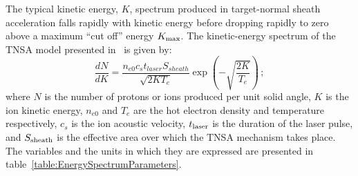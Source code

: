 The typical kinetic energy, $K$, spectrum produced in target-normal
sheath acceleration falls rapidly with kinetic energy before dropping
rapidly to zero above a maximum ``cut off'' energy $K_{\rm max}$.
The kinetic-energy spectrum of the TNSA model presented
in~\cite{10.1038/nphys199} is given by:
\begin{equation}
  \frac{dN}{dK} = \frac{n_{e0} c_{s} t_{laser} S_{sheath}}
                                 {\sqrt{2K T_{e}}}
                                 \exp\left(
                                     - \sqrt{\frac{2K}{T_{e}}}
                                     \right)\,;
  \label{Eq:Spct:0}
\end{equation}
where $N$ is the number of protons or ions produced per unit solid
angle, $K$ is the ion kinetic energy, $n_{e0}$ and
$T_e$ are the hot electron density and temperature respectively, $c_s$
is the ion acoustic velocity, $t_{\rm laser}$ is the duration of the
laser pulse, and $S_{\rm sheath}$ is the effective area over which the
TNSA mechanism takes place.
The variables and the units in which they are expressed are presented
in table~\ref{table:EnergySpectrumParameters}.
